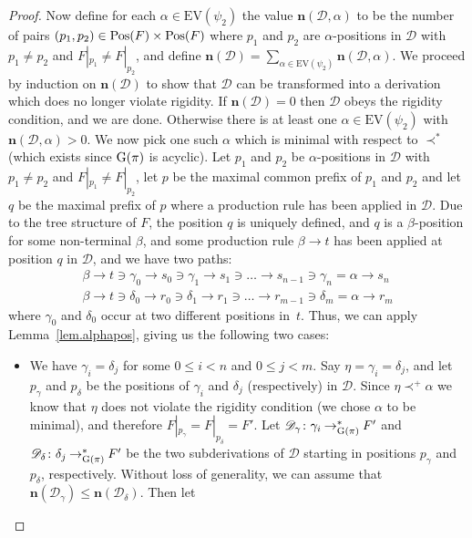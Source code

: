 \documentclass{LMCS}
\theoremstyle{plain}
\theoremstyle{definition}
\newcommand{\DD}{\mathcal{D}}
\newcommand{\sderel}[1]{\mathbin{\rightarrow_{#1}^*}}
\newcommand{\sreach}[1]{\mathbin{\prec_{#1}^*}}
\newcommand{\preach}[1]{\mathbin{\prec_{#1}^+}}
\newcommand{\nonrig}[2]{\mathbf{n}(#1,#2)}
\newcommand{\nonrigd}[1]{\mathbf{n}(#1)}
\newcommand{\EV}{\mathrm{EV}}	\newcommand{\EVc}{\mathrm{EV_c}}	\newcommand{\Hseq}{\mathrm{H}}	\newcommand{\Bsub}{\mathrm{B}}	\newcommand{\terms}[1]{\mathrm{tm}(#1)}	\newcommand{\ev}[1]{\mathrm{ev}(#1)}	\newcommand{\cred}{\rightsquigarrow}	\newcommand{\credm}{\stackrel{\mathit{ne}}{\rightsquigarrow}}	\newcommand{\genrel}{\longrightarrow}
\begin{document}
\begin{proof}
Now define for each $\alpha\in\EV(\psi_2)$ the value
$\nonrig{\DD}{\alpha}$ to be the number of pairs
$(p_1,p_2)\in\mathrm{Pos}(F)\times\mathrm{Pos}(F)$ where $p_1$ and $p_2$ are
$\alpha$-positions in $\DD$ with $p_1\neq p_2$ and $F|_{p_1}\neq
F|_{p_2}$, and define
$\nonrigd{\DD}=\sum_{\alpha\in\EV(\psi_2)}\nonrig{\DD}{\alpha}$. We
proceed by induction on
$\nonrigd{\DD}$ to show that $\DD$
can be transformed into a derivation which does no longer violate
rigidity. If $\nonrigd{\DD}=0$ then
$\DD$ obeys the rigidity condition, and we are done. Otherwise there
is at least one $\alpha\in\EV(\psi_2)$ with
$\nonrig{\DD}{\alpha}>0$. We now pick one such $\alpha$ which is
minimal with respect to $\sreach{}$ (which exists since
$\mathrm{G}(\pi)$ is acyclic). Let $p_1$ and $p_2$ be $\alpha$-positions in
$\DD$ with $p_1\neq p_2$ and $F|_{p_1}\neq F|_{p_2}$, let $p$ be
the maximal common prefix of $p_1$ and $p_2$ and let $q$ be the
maximal prefix of $p$ where a production rule has been applied in $\DD$. Due to the tree
structure of $F$, the position $q$ is uniquely defined, and $q$ is a
$\beta$-position for some non-terminal $\beta$, and some production
rule $\beta\to t$ has been applied at position $q$ in $\DD$, and we
have two paths:
\begin{equation*}
  \begin{array}{c}
    \beta\to t\ni\gamma_0\to s_0\ni\gamma_1\to s_1\ni\ldots
    \to s_{n-1}\ni\gamma_n=\alpha\to s_n
    \\[1ex]
    \beta\to t\ni\delta_0\to r_0\ni\delta_1\to r_1\ni\ldots
    \to r_{m-1}\ni\delta_m=\alpha\to r_m
  \end{array}
\end{equation*}
where $\gamma_0$ and $\delta_0$ occur at two different positions
in~$t$. Thus, we can apply Lemma~\ref{lem.alphapos}, giving us the
following two cases:
\begin{itemize}
\item We have $\gamma_i=\delta_j$ for some $0\le i<n$ and $0\le
  j<m$. Say $\eta=\gamma_i=\delta_j$, and let $p_{\gamma}$ and
  $p_{\delta}$ be the positions of $\gamma_i$ and $\delta_j$
  (respectively) in $\DD$. Since $\eta\preach{}\alpha$ we know that
  $\eta$ does not violate the rigidity condition (we chose $\alpha$ to
  be minimal), and therefore $F|_{p_{\gamma}}=F|_{p_\delta}=F'$. Let
  $\DD_\gamma\colon\gamma_i\sderel{\Gram{\pi}}F'$ and
  $\DD_\delta\colon\delta_j\sderel{\Gram{\pi}}F'$ be the two
  subderivations of $\DD$ starting in positions $p_{\gamma}$ and
  $p_{\delta}$, respectively. Without loss of generality, we can
  assume that $\nonrigd{\DD_\gamma}\le\nonrigd{\DD_\delta}$. Then let

\end{itemize}
\end{proof}
\end{document}

